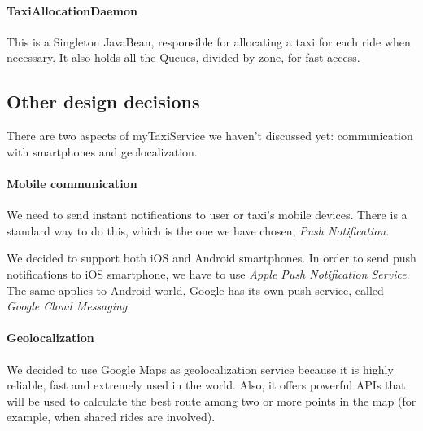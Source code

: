 \paragraph{TaxiAllocationDaemon} %
\label{par:taxiallocationdaemon}
This is a Singleton JavaBean, responsible for allocating a taxi for each ride when necessary. It also holds all the Queues, divided by zone, for fast access.

\begin{table}[h!]
\centering
{}
\end{table}


\pagebreak
\subsection{Other design decisions}

There are two aspects of myTaxiService we haven't discussed yet: communication 
with smartphones and geolocalization.

\paragraph {Mobile communication}
We need to send instant notifications to 
user or taxi's mobile devices. There is a standard way to do this, 
which is the one we have chosen, \textit{Push Notification}.

We decided to support both iOS and Android smartphones. In order to send push
notifications to iOS smartphone, we have to use \textit{Apple Push Notification Service}.
The same applies to Android world, Google has its own push service, called 
\textit{Google Cloud Messaging}.

\paragraph {Geolocalization}
We decided to use Google Maps as geolocalization service because it is highly
reliable, fast and extremely used in the world.
Also, it offers powerful APIs that will be used to calculate the best route
among two or more points in the map (for example, when shared rides are involved).